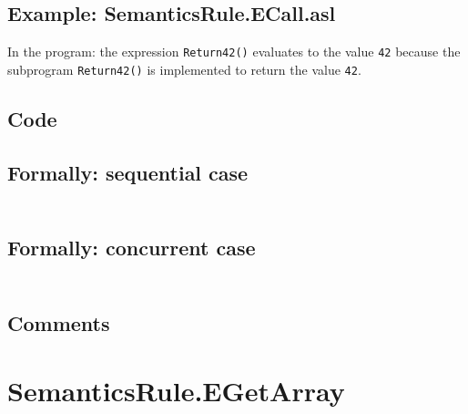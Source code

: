 \documentclass{book}
\begin{document}
  \subsection{Example: SemanticsRule.ECall.asl}
    In the program:
    the expression \texttt{Return42()} evaluates to the value \texttt{42} because the
    subprogram \texttt{Return42()} is implemented to return the value \texttt{42}.

  \subsection{Code}

  \subsection{Formally: sequential case}
  \begin{align}
  \end{align} 

  \subsection{Formally: concurrent case}
  \begin{align}
  \end{align} 

  \subsection{Comments}

\section{SemanticsRule.EGetArray \label{sec:SemanticsRule.EGetArray}}
\end{document}
